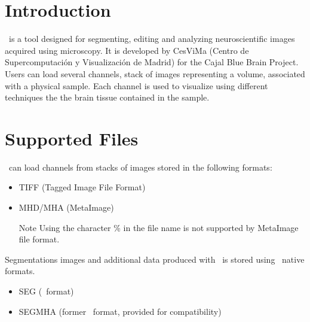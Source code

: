 \section{Introduction}

\espina\ is a tool designed for segmenting, editing and analyzing
neuroscientific images acquired using microscopy.
It is developed by CesViMa (Centro de Supercomputación y Visualización de
Madrid) for the Cajal Blue Brain Project.\\

Users can load several channels, stack of images representing a volume,
associated with a physical sample.  Each channel is used to visualize using
different techniques the the brain tissue contained in the sample.

\section{Supported Files}
\espina\ can load channels from stacks of images stored in the following formats:
\begin{itemize}
  \item TIFF (Tagged Image File Format)
  \item MHD/MHA (MetaImage)\\
\begin{bclogo}[couleur = yellow!33, logo=\bcattention]
{Note} Using the character \% in the file name is not supported
by MetaImage file format.
\end{bclogo}
\end{itemize}
Segmentations images and additional data produced with \espina\ is stored using
\espina\ native formats. 
\begin{itemize}
  \item SEG (\espina\ format)
  \item SEGMHA (former \espina\ format, provided for compatibility)
\end{itemize}
